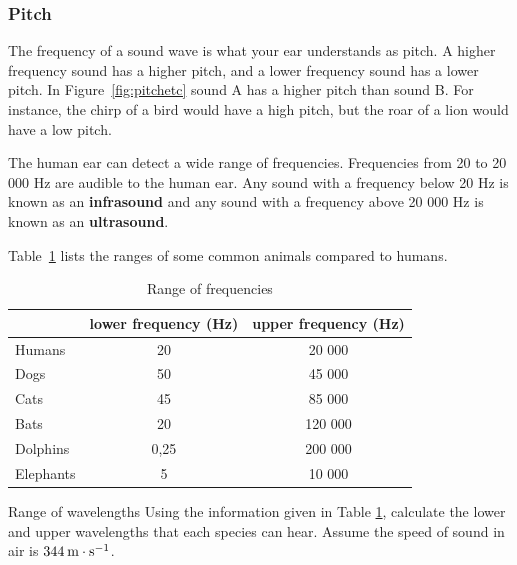             \subsubsection{Pitch}
            \nopagebreak
            \label{m38799*id183534}The frequency of a sound wave is what your ear understands as pitch. A higher frequency sound has a higher pitch, and a lower frequency sound has a lower pitch. In Figure~\ref{fig:pitchetc} sound A has a higher pitch than sound B. For instance, the chirp of a bird would have a high pitch, but the roar of a lion would have a low pitch.\par 
        \label{m38799*id183546}The human ear can detect a wide range of frequencies. Frequencies from 20 to 20 000 Hz are audible to the human ear. Any sound with a frequency below 20 Hz is known as an \textbf{infrasound} and any sound with a frequency above 20 000 Hz is known as an \textbf{ultrasound}. \par 
 Table~\ref{p:wsl:s11:rangeoff} lists the ranges of some common animals compared to humans.

\begin{table}[htbp]
\begin{center}
\caption{Range of frequencies}
\label{p:wsl:s11:rangeoff}
\begin{tabular}{|l|c|c|}\hline
&lower frequency (Hz) & upper frequency (Hz)\\\hline\hline
Humans & 20 & 20 000\\\hline
Dogs & 50 & 45 000\\\hline
Cats & 45 & 85 000\\\hline
Bats & 20 & 120 000\\\hline
Dolphins & 0,25 & 200 000\\\hline
Elephants & 5 & 10 000\\\hline
\hline
\end{tabular}
\end{center}
\end{table}
    \par
\begin{activity}{Range of wavelengths }
            \nopagebreak
        \label{m38799*id183776}Using the information given in Table \ref{p:wsl:s11:rangeoff}, calculate the lower and upper wavelengths that each species can hear. Assume the speed of sound in air is $344\phantom{\rule{2pt}{0ex}}\text{m}\ensuremath{\cdot}\text{s}{}^{-1}$.
\end{activity}
 
      \label{m38799*uid4}
